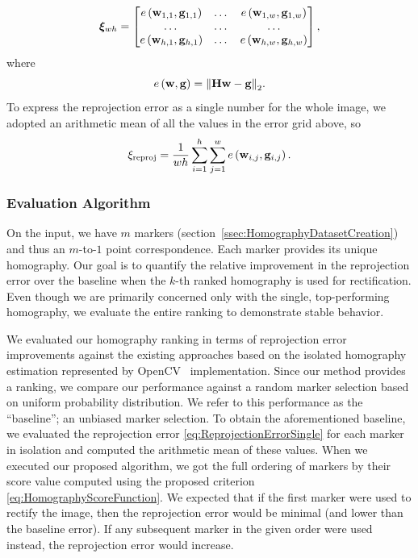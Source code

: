 \begin{equation}
    \label{eq:reprojection_error_grid}
    \boldsymbol{\xi}_{wh} =
    \begin{bmatrix}
        {e} \left( \mathbf{w}_{1, 1}, \mathbf{g}_{1, 1} \right) & \dots & {e} \left( \mathbf{w}_{1, w}, \mathbf{g}_{1, w} \right) \\
        \dots                                        & \dots & \dots                                        \\
        {e} \left( \mathbf{w}_{h, 1}, \mathbf{g}_{h, 1} \right) & \dots & {e} \left( \mathbf{w}_{h, w}, \mathbf{g}_{h, w} \right)
    \end{bmatrix},
\end{equation}
where
\begin{equation}
    {e} \left( \mathbf{w}, \mathbf{g} \right) = {\left\Vert {\mathbf{H}\mathbf{w}- \mathbf{g}} \right\Vert}_2.
\end{equation}
To express the reprojection error as a single number for the whole image, we adopted an arithmetic mean of all the values in the error grid above, so
\begin{equation}
    \label{eq:ReprojectionErrorSingle}
    \xi_{\text{reproj}} =
    \frac{1}{wh}
    \sum_{i = 1}^{h}
    \sum_{j = 1}^{w}
    {e} \left( \mathbf{w}_{i, j}, \mathbf{g}_{i, j} \right).
\end{equation}

\subsubsection{Evaluation Algorithm}
\label{sssec:EvaluationAlgorithm}

On the input, we have $m$ markers (section~\ref{ssec:HomographyDatasetCreation}) and thus an $m$-to-$1$ point correspondence. Each marker provides its unique homography. Our goal is to quantify the relative improvement in the reprojection error over the baseline when the $k$-th ranked homography is used for rectification. Even though we are primarily concerned only with the single, top-performing homography, we evaluate the entire ranking to demonstrate stable behavior.

We evaluated our homography ranking in terms of reprojection error improvements against the existing approaches based on the isolated homography estimation represented by OpenCV~\cite{bradski2008learning} implementation. Since our method provides a ranking, we compare our performance against a random marker selection based on uniform probability distribution. We refer to this performance as the ``baseline''; an unbiased marker selection. To obtain the aforementioned baseline, we evaluated the reprojection error \ref{eq:ReprojectionErrorSingle} for each marker in isolation and computed the arithmetic mean of these values. When we executed our proposed algorithm, we got the full ordering of markers by their score value computed using the proposed criterion \ref{eq:HomographyScoreFunction}. We expected that if the first marker were used to rectify the image, then the reprojection error would be minimal (and lower than the baseline error). If any subsequent marker in the given order were used instead, the reprojection error would increase.

